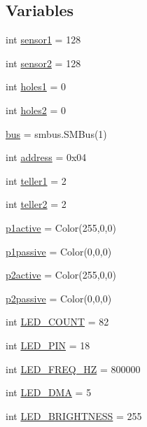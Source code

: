 \subsection*{Variables}
\begin{DoxyCompactItemize}
\item 
int \hyperlink{namespacegame_1_1i2c_a7e0dfd391eb5195c444ecafa938194e6}{sensor1} = 128
\item 
int \hyperlink{namespacegame_1_1i2c_ad8dff55b9286c066e6bc71950b710a28}{sensor2} = 128
\item 
int \hyperlink{namespacegame_1_1i2c_ada8d57d81c6d31174d5072cd306a5319}{holes1} = 0
\item 
int \hyperlink{namespacegame_1_1i2c_a9b974e58b92b6ace923493eb04219145}{holes2} = 0
\item 
\hyperlink{namespacegame_1_1i2c_a411bd59fecc82fdfda0e5c9d7da7447f}{bus} = smbus.\+S\+M\+Bus(1)
\item 
int \hyperlink{namespacegame_1_1i2c_a45c6bc6d1135dc398bf8deae861a2ebc}{address} = 0x04
\item 
int \hyperlink{namespacegame_1_1i2c_a7ddd85a4f113648910e222fb76d93506}{teller1} = 2
\item 
int \hyperlink{namespacegame_1_1i2c_a255c8064ec67df52c6aadc54ea744b11}{teller2} = 2
\item 
\hyperlink{namespacegame_1_1i2c_a41e4c864658657ecc0ecc43d65db5a64}{p1active} = Color(255,0,0)
\item 
\hyperlink{namespacegame_1_1i2c_a74f6b1b14e9155ac66e89d1c72c3ace9}{p1passive} = Color(0,0,0)
\item 
\hyperlink{namespacegame_1_1i2c_a9ba589e5b81a9e64152ebf0c727a3238}{p2active} = Color(255,0,0)
\item 
\hyperlink{namespacegame_1_1i2c_a16792386ad01936c15a8677177571de3}{p2passive} = Color(0,0,0)
\item 
int \hyperlink{namespacegame_1_1i2c_a0150eb7d9551697284fa8def1d6a5e78}{L\+E\+D\+\_\+\+C\+O\+U\+NT} = 82
\item 
int \hyperlink{namespacegame_1_1i2c_a7d6ed2029581b42043aa921270f03362}{L\+E\+D\+\_\+\+P\+IN} = 18
\item 
int \hyperlink{namespacegame_1_1i2c_a4985f02a4206248cfb12e46ac7e5fa1a}{L\+E\+D\+\_\+\+F\+R\+E\+Q\+\_\+\+HZ} = 800000
\item 
int \hyperlink{namespacegame_1_1i2c_a3577c4e268c23fe92bb64fdb4c878027}{L\+E\+D\+\_\+\+D\+MA} = 5
\item 
int \hyperlink{namespacegame_1_1i2c_ac0bf31bc536242ae4682e1d4e782f671}{L\+E\+D\+\_\+\+B\+R\+I\+G\+H\+T\+N\+E\+SS} = 255

\end{DoxyCompactItemize}
